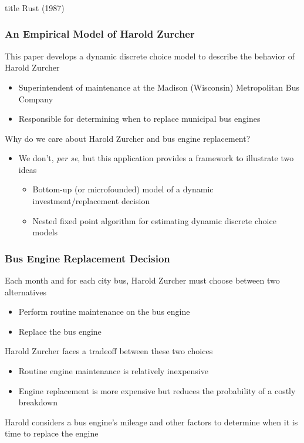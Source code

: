 \documentclass{beamer}
\begin{document}
\begin{frame}\frametitle{}
    \vfill
    \centering
    \begin{beamercolorbox}[center]{title}
        \Large Rust (1987)
    \end{beamercolorbox}
    \vfill
\end{frame}

\begin{frame}\frametitle{An Empirical Model of Harold Zurcher}
    This paper develops a dynamic discrete choice model to describe the behavior of Harold Zurcher
    \begin{itemize}
    	\item Superintendent of maintenance at the Madison (Wisconsin) Metropolitan Bus Company
    	\item Responsible for determining when to replace municipal bus engines
    \end{itemize}
    \vspace{2ex}
    Why do we care about Harold Zurcher and bus engine replacement?
    \begin{itemize}
    	\item We don't, \emph{per se}, but this application provides a framework to illustrate two ideas
    	\begin{itemize}
    		\item Bottom-up (or microfounded) model of a dynamic investment/replacement decision
    		\item Nested fixed point algorithm for estimating dynamic discrete choice models
   		\end{itemize}
    \end{itemize}
\end{frame}

\begin{frame}\frametitle{Bus Engine Replacement Decision}
    Each month and for each city bus, Harold Zurcher must choose between two alternatives
    \begin{itemize}
    	\item Perform routine maintenance on the bus engine
    	\item Replace the bus engine
    \end{itemize}
    \vspace{2ex}
    Harold Zurcher faces a tradeoff between these two choices
    \begin{itemize}
    	\item Routine engine maintenance is relatively inexpensive
    	\item Engine replacement is more expensive but reduces the probability of a costly breakdown
    \end{itemize}
    \vspace{2ex}
    Harold considers a bus engine's mileage and other factors to determine when it is time to replace the engine
\end{frame}
\end{document}

